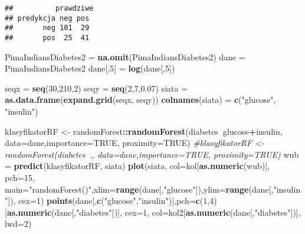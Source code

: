 \documentclass[polish,]{book}
\newenvironment{Shaded}{\begin{snugshade}}{\end{snugshade}}
\newcommand{\CommentTok}[1]{\textcolor[rgb]{0.56,0.35,0.01}{\textit{#1}}}
\newcommand{\DataTypeTok}[1]{\textcolor[rgb]{0.13,0.29,0.53}{#1}}
\newcommand{\DecValTok}[1]{\textcolor[rgb]{0.00,0.00,0.81}{#1}}
\newcommand{\FloatTok}[1]{\textcolor[rgb]{0.00,0.00,0.81}{#1}}
\newcommand{\KeywordTok}[1]{\textcolor[rgb]{0.13,0.29,0.53}{\textbf{#1}}}
\newcommand{\NormalTok}[1]{#1}
\newcommand{\OperatorTok}[1]{\textcolor[rgb]{0.81,0.36,0.00}{\textbf{#1}}}
\newcommand{\OtherTok}[1]{\textcolor[rgb]{0.56,0.35,0.01}{#1}}
\newcommand{\StringTok}[1]{\textcolor[rgb]{0.31,0.60,0.02}{#1}}
\begin{document}
\begin{verbatim}
##          prawdziwe
## predykcja neg pos
##       neg 101  29
##       pos  25  41
\end{verbatim}

\begin{Shaded}
\begin{Highlighting}[]
\NormalTok{PimaIndiansDiabetes2 =}\StringTok{ }\KeywordTok{na.omit}\NormalTok{(PimaIndiansDiabetes2)}
\NormalTok{dane =}\StringTok{ }\NormalTok{PimaIndiansDiabetes2}
\NormalTok{dane[,}\DecValTok{5}\NormalTok{] =}\StringTok{ }\KeywordTok{log}\NormalTok{(dane[,}\DecValTok{5}\NormalTok{])}

\NormalTok{seqx =}\StringTok{ }\KeywordTok{seq}\NormalTok{(}\DecValTok{30}\NormalTok{,}\DecValTok{210}\NormalTok{,}\DecValTok{2}\NormalTok{)}
\NormalTok{seqy =}\StringTok{ }\KeywordTok{seq}\NormalTok{(}\DecValTok{2}\NormalTok{,}\DecValTok{7}\NormalTok{,}\FloatTok{0.07}\NormalTok{)}
\NormalTok{siata =}\StringTok{ }\KeywordTok{as.data.frame}\NormalTok{(}\KeywordTok{expand.grid}\NormalTok{(seqx, seqy))}
\KeywordTok{colnames}\NormalTok{(siata) =}\StringTok{ }\KeywordTok{c}\NormalTok{(}\StringTok{"glucose"}\NormalTok{, }\StringTok{"insulin"}\NormalTok{)}

\NormalTok{klasyfikatorRF <-}\StringTok{ }\NormalTok{randomForest}\OperatorTok{::}\KeywordTok{randomForest}\NormalTok{(diabetes}\OperatorTok{~}\NormalTok{glucose}\OperatorTok{+}\NormalTok{insulin,}
                                             \DataTypeTok{data=}\NormalTok{dane,}\DataTypeTok{importance=}\OtherTok{TRUE}\NormalTok{, }\DataTypeTok{proximity=}\OtherTok{TRUE}\NormalTok{)}
\CommentTok{#klasyfikatorRF <- randomForest(diabetes~., data=dane,importance=TRUE, proximity=TRUE)}
\NormalTok{wub =}\StringTok{ }\KeywordTok{predict}\NormalTok{(klasyfikatorRF, siata)}
\KeywordTok{plot}\NormalTok{(siata, }\DataTypeTok{col=}\NormalTok{kol[}\KeywordTok{as.numeric}\NormalTok{(wub)], }\DataTypeTok{pch=}\DecValTok{15}\NormalTok{, }
     \DataTypeTok{main=}\StringTok{"randomForest()"}\NormalTok{,}\DataTypeTok{xlim=}\KeywordTok{range}\NormalTok{(dane[,}\StringTok{"glucose"}\NormalTok{]),}\DataTypeTok{ylim=}\KeywordTok{range}\NormalTok{(dane[,}\StringTok{"insulin"}\NormalTok{]),}
     \DataTypeTok{cex=}\DecValTok{1}\NormalTok{)}
\KeywordTok{points}\NormalTok{(dane[,}\KeywordTok{c}\NormalTok{(}\StringTok{"glucose"}\NormalTok{,}\StringTok{"insulin"}\NormalTok{)],}\DataTypeTok{pch=}\KeywordTok{c}\NormalTok{(}\DecValTok{1}\NormalTok{,}\DecValTok{4}\NormalTok{)[}\KeywordTok{as.numeric}\NormalTok{(dane[,}\StringTok{"diabetes"}\NormalTok{])], }
       \DataTypeTok{cex=}\DecValTok{1}\NormalTok{, }\DataTypeTok{col=}\NormalTok{kol2[}\KeywordTok{as.numeric}\NormalTok{(dane[,}\StringTok{"diabetes"}\NormalTok{])], }\DataTypeTok{lwd=}\DecValTok{2}\NormalTok{)}
\end{Highlighting}
\end{Shaded}
\end{document}
